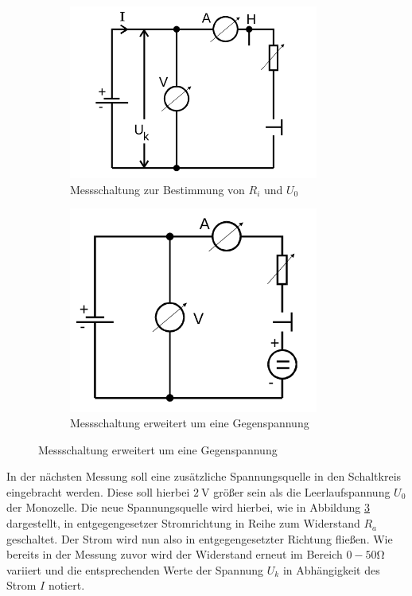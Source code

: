 \begin{figure}[h]
\centering
\begin{subfigure}{0.53\textwidth}
\centering
\includegraphics[width=0.9\textwidth]{Bilder/Abbildung2.png}
\caption{Messschaltung zur Bestimmung von $R_i$ und $U_0$ \cite{Anleitung}}
\label{fig:abbildung2}
\end{subfigure}
\begin{subfigure}{0.45\textwidth}
\centering
\includegraphics[width=0.9\textwidth]{Bilder/Abbildung3.png}
\caption{Messschaltung  erweitert um eine Gegenspannung \cite{Anleitung}}
\label{fig:abbildung3}
\end{subfigure}
\end{figure}
In der nächsten Messung soll eine zusätzliche Spannungsquelle in den Schaltkreis eingebracht werden.
Diese soll hierbei $\SI{2}{\volt}$ größer sein als die Leerlaufspannung $U_0$ der Monozelle.
Die neue Spannungsquelle wird hierbei, wie in Abbildung \ref{fig:abbildung3} dargestellt, in entgegengesetzer Stromrichtung in Reihe zum Widerstand $R_a$ geschaltet.
Der Strom wird nun also in entgegengesetzter Richtung fließen. Wie bereits in der Messung zuvor wird der Widerstand erneut im Bereich $0-50\si{\ohm}$ variiert und die entsprechenden Werte der Spannung $U_k$ in Abhängigkeit des Strom $I$ notiert.

